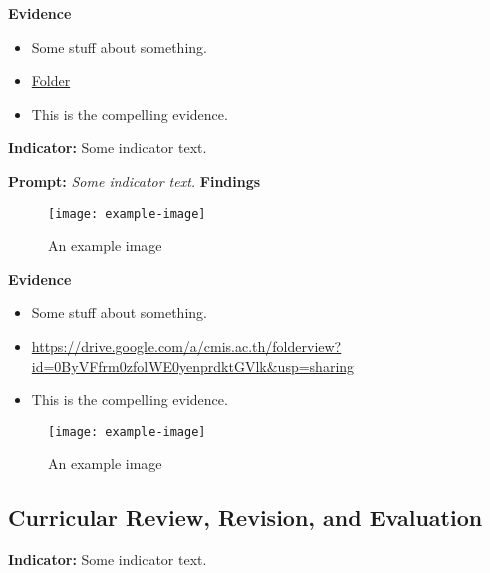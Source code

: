 \documentclass{report}
\begin{document}
\noindent\textbf{Evidence}
\vspace{-\topsep}

\begin{itemize}[leftmargin=*]
\setlength{\parskip}{0pt}
\setlength{\itemsep}{0pt plus 1pt}
\item Some stuff about something.
\item \href{https://drive.google.com/a/cmis.ac.th/folderview?id=0ByVFfrm0zfolWE0yenprdktGVlk&usp=sharing}{Folder}
\item This is the compelling evidence.
\end{itemize}

\noindent\textbf{Indicator:} Some indicator text.

\noindent\textbf{Prompt:} \textit{Some indicator text.}
\noindent\textbf{Findings}

\blindtext

\blinditemize[6]

\blindtext

\begin{figure}[h!]
\caption[An example image]{An example image}
\centering
\texttt{[image: example-image]}
\end{figure}


\noindent\textbf{Evidence}
\vspace{-\topsep}

\begin{itemize}[leftmargin=*]
\setlength{\parskip}{0pt}
\setlength{\itemsep}{0pt plus 1pt}
\item Some stuff about something.
\item \url{https://drive.google.com/a/cmis.ac.th/folderview?id=0ByVFfrm0zfolWE0yenprdktGVlk&usp=sharing}
\item This is the compelling evidence.
\end{itemize}

\begin{figure}[h!]
\caption[An example image]{An example image}
\centering
\texttt{[image: example-image]}
\end{figure}


\subsection{Curricular Review, Revision, and Evaluation}
\blindtext

\blindtext
 
\noindent\textbf{Indicator:} Some indicator text.
\end{document}
